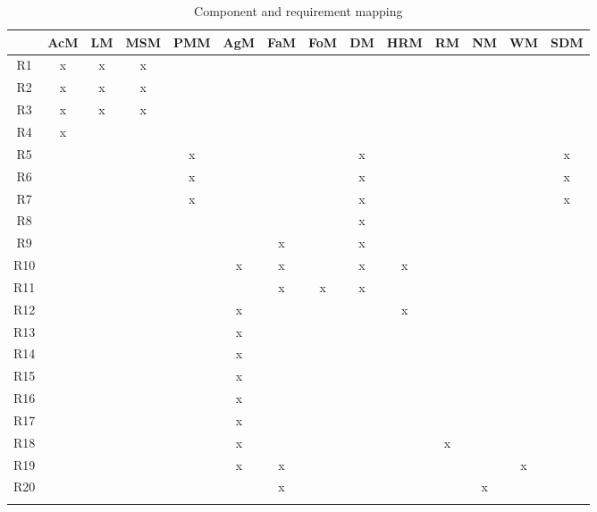 \documentclass[table, 12pt]{article}
\begin{document}
\begin{longtable}{|c|c|c|c|c|c|c|c|c|c|c|c|c|c|}

    \hline
    & \cellcolor{blue!30}AcM & \cellcolor{blue!30}LM & \cellcolor{blue!30}MSM & \cellcolor{blue!30}PMM & \cellcolor{blue!30}AgM & \cellcolor{blue!30}FaM & \cellcolor{blue!30}FoM & \cellcolor{blue!30}DM & \cellcolor{blue!30}HRM & \cellcolor{blue!30}RM & \cellcolor{blue!30}NM & \cellcolor{blue!30}WM & \cellcolor{blue!30}SDM\\\hline
    \cellcolor{SpringGreen!50}R1 & x & x & x &    &       &       &   &       &  &&    &   &\\\hline
    \cellcolor{SpringGreen!50}R2 & x & x & x &    &       &       &   &       &  &&    &   &\\\hline
    \cellcolor{SpringGreen!50}R3 & x & x & x &    &       &       &   &       &  &&    &   &\\\hline
    \cellcolor{SpringGreen!50}R4 & x &  &  &    &       &       &   &       &  &&    &   &\\\hline
    \cellcolor{SpringGreen!50}R5 &    & & & x & & && x && & &&x\\\hline
    \cellcolor{SpringGreen!50}R6 &    & & & x & & && x && & &&x\\\hline
    \cellcolor{SpringGreen!50}R7 &    & & & x & & && x && & &&x\\\hline
    \cellcolor{SpringGreen!50}R8 &    & & & & & && x && & &&\\\hline
    \cellcolor{SpringGreen!50}R9 &    & & & & & x && x && & &&\\\hline
    \cellcolor{SpringGreen!50}R10 &    & & & & x & x && x & x & & &&\\\hline
    \cellcolor{SpringGreen!50}R11 &    & & & & & x & x & x && & &&\\\hline
    \cellcolor{SpringGreen!50}R12 &    & & & & x &  &&  & x & & &&\\\hline
    \cellcolor{SpringGreen!50}R13 &    & & & & x &  &&  &  & & &&\\\hline
    \cellcolor{SpringGreen!50}R14 &    & & & & x &  &&  &  & & &&\\\hline
    \cellcolor{SpringGreen!50}R15 &    & & & & x &  &&  &  & & &&\\\hline
    \cellcolor{SpringGreen!50}R16 &    & & & & x &  &&  &  & & &&\\\hline
    \cellcolor{SpringGreen!50}R17 &    & & & & x &  &&  &  & & &&\\\hline
    \cellcolor{SpringGreen!50}R18 &    & & & & x &  &&  &  & x & &&\\\hline
    \cellcolor{SpringGreen!50}R19 &    & & & & x & x &&  &  & & & x &\\\hline
    \cellcolor{SpringGreen!50}R20 &    & & & & & x &&  &  & & x &&\\\hline
    \caption{Component and requirement mapping}\\
\end{longtable}
\end{document}
